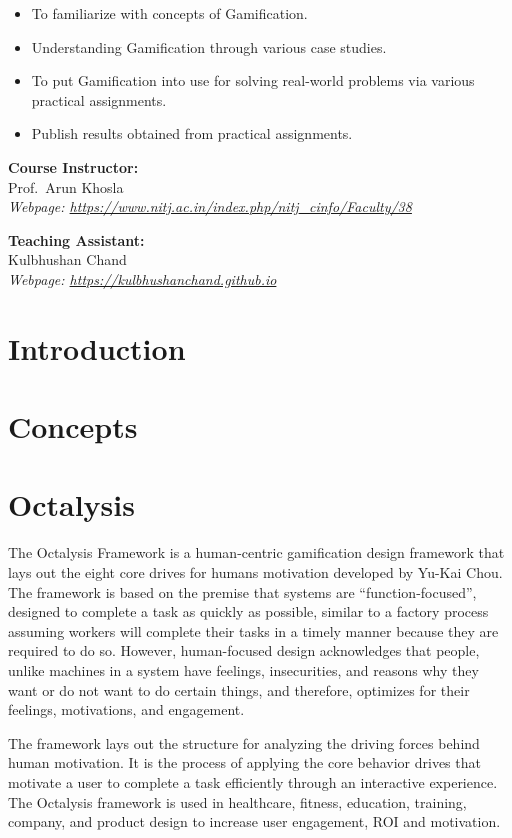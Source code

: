 \documentclass[
]{book}
\providecommand{\tightlist}{%
  \setlength{\itemsep}{0pt}\setlength{\parskip}{0pt}}
\begin{document}
\begin{itemize}
\tightlist
\item
  To familiarize with concepts of Gamification.
\item
  Understanding Gamification through various case studies.
\item
  To put Gamification into use for solving real-world problems via various practical assignments.
\item
  Publish results obtained from practical assignments.
\end{itemize}

\textbf{Course Instructor:}\\
Prof.~Arun Khosla\\
\emph{Webpage: \url{https://www.nitj.ac.in/index.php/nitj_cinfo/Faculty/38}}

\textbf{Teaching Assistant:}\\
Kulbhushan Chand\\
\emph{Webpage: \url{https://kulbhushanchand.github.io}}

\hypertarget{intro}{%
\chapter{Introduction}\label{intro}}

\hypertarget{concepts}{%
\chapter{Concepts}\label{concepts}}

\hypertarget{octalysis}{%
\chapter{Octalysis}\label{octalysis}}

The Octalysis Framework is a human-centric gamification design framework that lays out the eight core drives for humans motivation developed by Yu-Kai Chou. The framework is based on the premise that systems are ``function-focused'', designed to complete a task as quickly as possible, similar to a factory process assuming workers will complete their tasks in a timely manner because they are required to do so. However, human-focused design acknowledges that people, unlike machines in a system have feelings, insecurities, and reasons why they want or do not want to do certain things, and therefore, optimizes for their feelings, motivations, and engagement.

The framework lays out the structure for analyzing the driving forces behind human motivation. It is the process of applying the core behavior drives that motivate a user to complete a task efficiently through an interactive experience. The Octalysis framework is used in healthcare, fitness, education, training, company, and product design to increase user engagement, ROI and motivation.
\end{document}
